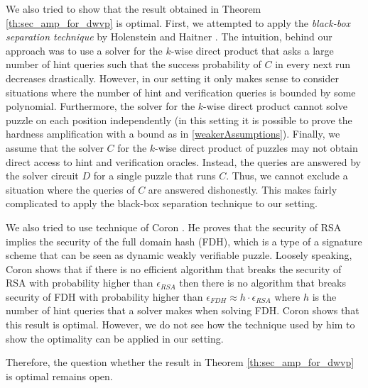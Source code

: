 We also tried to show that the result obtained in Theorem \ref{th:sec_amp_for_dwvp} is optimal.
First, we attempted to apply the \textit{black-box separation technique} by Holenstein and Haitner \cite{haitner2009possibility}.
The intuition, behind our approach was to use a solver for the $k$-wise direct product that asks a large number of hint queries such that
the success probability of $C$ in every next run decreases drastically.
However, in our setting it only makes sense to consider situations where the number of hint and verification queries is bounded by some polynomial.
Furthermore, the solver for the $k$-wise direct product cannot solve puzzle on each position independently (in this setting it is possible
to prove the hardness amplification with a bound as in \ref{weakerAssumptions}).
Finally, we assume that the solver $C$ for the $k$-wise direct product of puzzles may not obtain direct access to hint and verification oracles.
Instead, the queries are answered by the solver circuit $D$ for a single puzzle that runs $C$. Thus, we cannot exclude a situation where the queries of $C$
are answered dishonestly.
This makes fairly complicated to apply the black-box separation technique to our setting.

We also tried to use technique of Coron \cite{coron2000exact, coron2002optimal}.
He proves that the security of RSA implies the security of the full domain hash (FDH),
which is a type of a signature scheme that can be seen as dynamic weakly verifiable puzzle.
Loosely speaking, Coron shows that if there is no efficient algorithm that breaks the security of RSA with probability higher
than $\epsilon_{\mathit{RSA}}$ then there is no algorithm that breaks security of FDH with probability higher than
$\epsilon_{\mathit{FDH}} \approx h \cdot \epsilon_{\mathit{RSA}}$ where $h$ is the number of hint queries that a solver makes when solving FDH.
Coron shows that this result is optimal. However, we do not see how the technique used by him to show the optimality can be applied in our setting.

Therefore, the question whether the result in Theorem \ref{th:sec_amp_for_dwvp} is optimal remains open.

